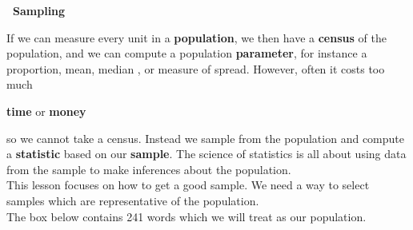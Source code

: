 \def\theTopic{Sampling }
\def\dayNum{3}

\begin{center}
{\large \bf\ Sampling}
\end{center}

If we can measure every unit in a {\bf population}, we then have a
{\bf census} of the population, and  we can 
compute a population {\bf parameter}, for instance a proportion, mean,
median , or measure of spread. However, often it costs too much
\vspace{-.4cm}
\begin{center}
  {\large\bf  time}\hspace{2cm} or\hspace{2cm} {\bf\large money}
\vspace{-.4cm}
\end{center}
      so we cannot take a census.  Instead we  sample from the
      population and compute a {\bf statistic} based on our {\bf
      sample}. The science of statistics is all about using data from
    the sample to make inferences about the population.\\
  This lesson focuses on how to  get a good sample.  We need a way to select
  samples which are representative of the population.
  \\
  The box below contains 241 words which we will treat as our population.
